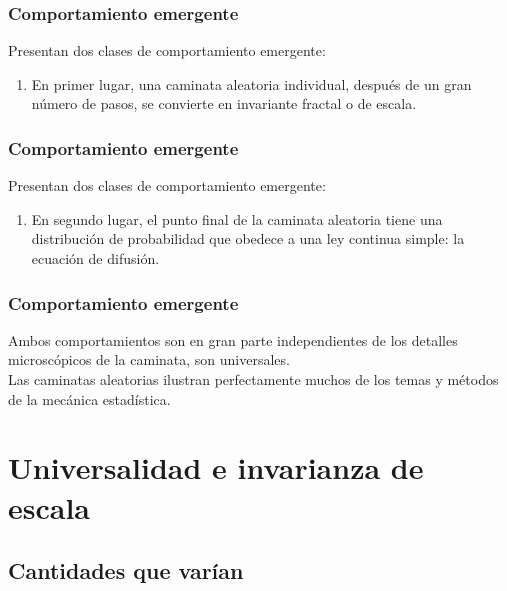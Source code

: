 \documentclass[12pt]{beamer}
\begin{document}
\begin{frame}
\frametitle{Comportamiento emergente}
Presentan dos clases de comportamiento emergente:
\begin{enumerate}[<+->]
\item En primer lugar, una caminata aleatoria individual, después de un gran número de pasos, se convierte en invariante fractal o de escala.
\seti
\end{enumerate}
\end{frame}
\begin{frame}
\frametitle{Comportamiento emergente}
Presentan dos clases de comportamiento emergente:
\begin{enumerate}[<+->]
\conti
\item En segundo lugar, el punto final de la caminata aleatoria tiene una distribución de probabilidad que obedece a una ley continua simple: la ecuación de difusión.
\end{enumerate}
\end{frame}
\begin{frame}
\frametitle{Comportamiento emergente}
Ambos comportamientos son en gran parte independientes de los detalles microscópicos de la caminata, son universales.
\\
\bigskip
\pause
Las caminatas aleatorias ilustran perfectamente muchos de los temas y métodos de la mecánica estadística.
\end{frame}


\section{Universalidad e invarianza de escala}
\subsection{Cantidades que varían}
\end{document}
